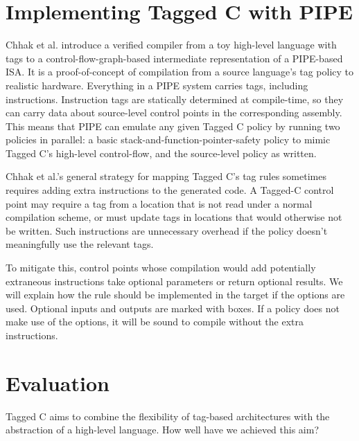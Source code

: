 \documentclass{llncs}
\begin{document}
\begin{table}[t]
  


\section{Implementing Tagged C with PIPE}
\label{sec:optionals}

Chhak et al. \cite{Chhak21:Tagine} introduce a verified compiler from a toy
high-level language with tags
to a control-flow-graph-based intermediate representation of a PIPE-based
ISA. It is a proof-of-concept of compilation from a source language's tag policy to
realistic hardware. Everything in a PIPE system carries tags, including instructions. 
Instruction tags are statically determined at compile-time, so they can carry data about source-level
control points in the corresponding assembly. This means that PIPE can emulate any given Tagged C
policy by running two policies in parallel: a basic stack-and-function-pointer-safety policy to mimic Tagged C's
high-level control-flow, and the source-level policy as written.

Chhak et al.'s general strategy for mapping Tagged C's tag rules sometimes requires adding extra
instructions to the generated code. A Tagged-C control point
may require a tag from a location that is not read under a normal compilation scheme, or must update tags
in locations that would otherwise not be written. Such instructions are unnecessary overhead if the policy
doesn't meaningfully use the relevant tags.

To mitigate this, control points whose compilation would add potentially extraneous instructions
take optional parameters or return optional results. We will explain how the rule should be
implemented in the target if the options are used.
Optional inputs and outputs are marked with boxes. If a policy does not make use of the options, it will
be sound to compile without the extra instructions.

\section{Evaluation}
\label{sec:evaluation}

Tagged C aims to combine the flexibility of tag-based architectures with the abstraction
of a high-level language. How well have we achieved this aim?


\end{table}
\end{document}
